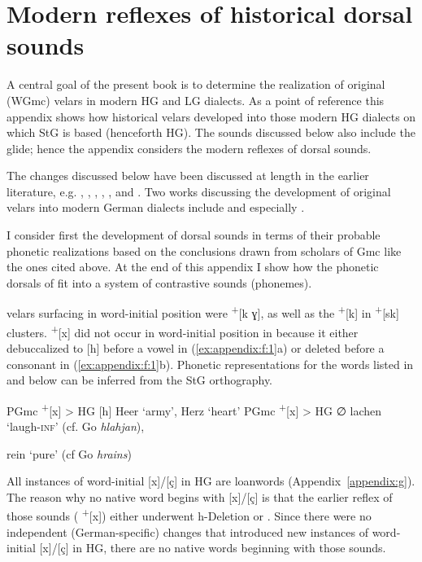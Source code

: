\chapter{Modern reflexes of historical dorsal sounds}\label{appendix:f}

A central goal of the present book is to determine the realization of original (WGmc) velars in modern HG and LG dialects. As a point of reference this appendix shows how historical velars developed into those modern HG dialects on which StG is based (henceforth HG). The sounds discussed below also include the  glide; hence the appendix considers the modern reflexes of dorsal sounds.

The changes discussed below have been discussed at length in the earlier literature, e.g. \citet{Wright1907}, \citet{Prokosch1938}, \citet{vonKienle1969}, \citet{Russ1978, Russ1982}, \citet{Szulc2002}, and \citet{Fulk2018}. Two works discussing the development of original velars into modern German dialects include \citet{Behaghel1911} and especially \citet{Schirmunski1962}.

I consider first the development of  dorsal sounds in terms of their probable phonetic realizations based on the conclusions drawn from scholars of Gmc like the ones cited above. At the end of this appendix I show how the phonetic dorsals of  fit into a system of contrastive sounds (phonemes).

 velars surfacing in word-initial position were \textsuperscript{+}[k ɣ], as well as the \textsuperscript{+}[k] in \textsuperscript{+}[sk] clusters.  \textsuperscript{+}[x] did not occur in word-initial position in  because it either debuccalized to [h] before a vowel in (\ref{ex:appendix:f:1}a) or deleted before a consonant in (\ref{ex:appendix:f:1}b). Phonetic representations for the words listed in  and below can be inferred from the StG orthography.

\ea%
    \label{ex:appendix:f:1}
\ea  PGmc \textsuperscript{+}[x] > HG [h]  Heer ‘army’, Herz ‘heart’
\ex   PGmc \textsuperscript{+}[x] > HG ∅  lachen ‘laugh\textsc{{}-inf}’ (cf. Go \textit{hlahjan}),

          rein ‘pure’ (cf Go \textit{hrains})

\z
\z

All instances of word-initial [x]/[ç] in HG are loanwords (Appendix~\ref{appendix:g}). The reason why no native word begins with [x]/[ç] is that the earlier reflex of those sounds ( \textsuperscript{+}[x]) either underwent h-Deletion or . Since there were no independent (German-specific) changes that introduced new instances of word-initial [x]/[ç] in HG, there are no native words beginning with those sounds.

